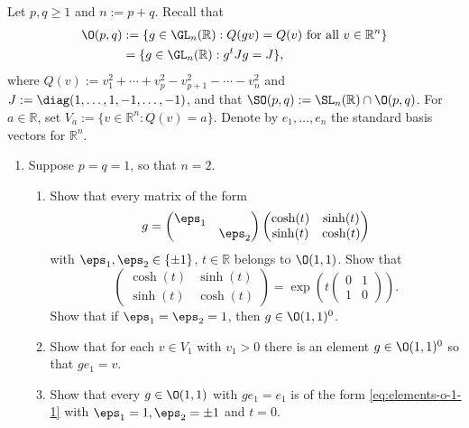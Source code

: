 \documentclass[reqno]{amsart} 
\begin{document}
\begin{homework}\label{hw:2}
  Let $p, q \geq 1$ and $n := p + q$.  Recall that
  \begin{align*}
    \O(p,q) &:= \{g \in \GL_n(\mathbb{R}) : Q(g v) = Q(v)
              \text{ for all } v \in \mathbb{R}^n\} \\
            &=
              \{g \in \GL_n(\mathbb{R}): g^t J g = J \},
  \end{align*}
  where $Q(v) := v_1^2 + \dotsb + v_p^2 - v_{p+1}^2 - \dotsb - v_n^2$ and $J := \diag(1,\dotsc,1,-1,\dotsc,-1)$, and that $\SO(p,q) := \SL_n(\mathbb{R}) \cap \O(p,q)$.  For $a \in \mathbb{R}$, set $V_a := \{v \in \mathbb{R}^n : Q(v) = a\}$.  Denote by $e_1,\dotsc,e_n$ the standard basis vectors for $\mathbb{R}^n$.
  \begin{enumerate}
  \item Suppose $p = q = 1$, so that $n = 2$.
    \begin{enumerate}
    \item Show that every matrix of the form
      \begin{equation}\label{eq:elements-o-1-1}
        g = 
        \begin{pmatrix}
          \eps_1 &  \\
                 & \eps_2
        \end{pmatrix}
        \begin{pmatrix}
          \cosh(t) & \sinh(t) \\
          \sinh(t) & \cosh(t)
        \end{pmatrix}
      \end{equation}
      with $\eps_1,\eps_2 \in \{\pm 1\}$, $t \in \mathbb{R}$ belongs to $\O(1,1)$.  Show that
      \begin{equation*}
        \begin{pmatrix}
          \cosh(t) & \sinh(t) \\
          \sinh(t) & \cosh(t)
        \end{pmatrix}
        = \exp (t 
\begin{pmatrix}
          0 & 1 \\
          1 & 0
        \end{pmatrix}
).
      \end{equation*}
      Show that if $\eps_1 = \eps_2 = 1$, then $g \in \O(1,1)^0$.
    \item Show that for each $v \in V_1$ with $v_1 > 0$ there is an element $g \in \O(1,1)^0$ so that $g e_1 = v$.
    \item Show that every $g \in \O(1,1)$ with $g e_1 = e_1$ is of the form \eqref{eq:elements-o-1-1} with $\eps_1 = 1, \eps_2 = \pm 1$ and $t = 0$.

\end{enumerate}
\end{enumerate}
\end{homework}
\end{document}
